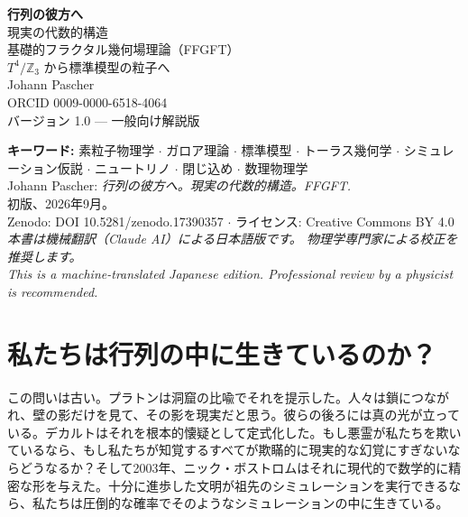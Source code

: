 \documentclass[11pt,openany]{book}
\begin{document}
\frontmatter

\begin{titlepage}
\centering\vspace*{1.5cm}
{\Huge\bfseries 行列の彼方へ\\[0.5em]}
{\Large 現実の代数的構造\\[1em]}
{\large 基礎的フラクタル幾何場理論（FFGFT）\\[0.3em]}
{\normalsize $T^4/\mathbb{Z}_3$ から標準模型の粒子へ\\[2em]}
{\Large Johann Pascher\\[0.5em]}
{\normalsize ORCID 0009-0000-6518-4064\\[2em]}
\vfill
{\small バージョン 1.0 --- 一般向け解説版}
\end{titlepage}

\newpage\thispagestyle{empty}%
{\small
\noindent\textbf{キーワード:} 素粒子物理学 $\cdot$ ガロア理論 $\cdot$ 標準模型 $\cdot$
トーラス幾何学 $\cdot$ シミュレーション仮説 $\cdot$ ニュートリノ $\cdot$
閉じ込め $\cdot$ 数理物理学\\[1em]
\noindent Johann Pascher: \textit{行列の彼方へ。現実の代数的構造。FFGFT.}\\
初版、2026年9月。\\[0.6em]
\noindent Zenodo: DOI 10.5281/zenodo.17390357 $\cdot$
ライセンス: Creative Commons BY 4.0\\[0.5em]
\noindent\textit{本書は機械翻訳（Claude AI）による日本語版です。
物理学専門家による校正を推奨します。}\\
\noindent\textit{This is a machine-translated Japanese edition.
Professional review by a physicist is recommended.}
}

\tableofcontents
\mainmatter

\chapter{私たちは行列の中に生きているのか？}

この問いは古い。プラトンは洞窟の比喩でそれを提示した。人々は鎖につながれ、壁の影だけを見て、その影を現実だと思う。彼らの後ろには真の光が立っている。デカルトはそれを根本的懐疑として定式化した。もし悪霊が私たちを欺いているなら、もし私たちが知覚するすべてが欺瞞的に現実的な幻覚にすぎないならどうなるか？そして2003年、ニック・ボストロムはそれに現代的で数学的に精密な形を与えた。十分に進歩した文明が祖先のシミュレーションを実行できるなら、私たちは圧倒的な確率でそのようなシミュレーションの中に生きている。
\end{document}
